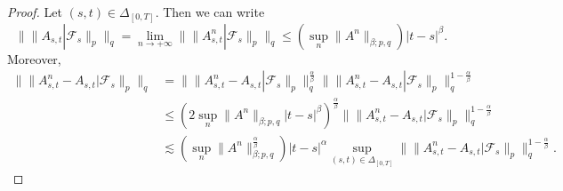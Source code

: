 \documentclass[11pt,a4paper]{article}
\theoremstyle{plain}
\begin{document}
\begin{proof}
  Let $(s, t) \in \Delta_{[0, T]}$. Then we can write \begin{equation*}
      \|\|A_{s, t} | \mathcal{F}_s \|_p \|_q = \lim_{n \to + \infty} \|\|A^n_{s, t} | \mathcal{F}_s \|_p \|_q \le (\sup_n \|A^n \|_{\beta ; p, q}) | t - s |^{\beta}.
  \end{equation*} Moreover,
  \begin{align*}
    \|\|A^n_{s, t} - A_{s, t} | \mathcal{F}_s \|_p \|_q & = 
    \|\|A^n_{s, t} - A_{s, t} | \mathcal{F}_s  \|_p
    \|_q^{\frac{\alpha}{\beta}} \|\|A^n_{s, t} - A_{s, t} | \mathcal{F}_s  \|_p \|_q^{1 - \frac{\alpha}{\beta}}\\
    & \le (2 \sup_n \|A^n \|_{\beta ; p, q}  | t - s
    |^{\beta})^{\frac{\alpha}{\beta}}  \|\|A^n_{s, t} - A_{s, t} | \mathcal{F}_s \|_p \|_q^{1 - \frac{\alpha}{\beta}}\\
    & \lesssim  \left( \sup_n \|A^n \|_{\beta ; p, q}^{\frac{\alpha}{\beta}}\right) | t - s |^{\alpha}  \sup_{(s, t) \in \Delta_{[0, T]}} \|\|A^n_{s, t} - A_{s, t} | \mathcal{F}_s  \|_p \|_q^{1 - \frac{\alpha}{\beta}} .
  \end{align*}
\end{proof}
\end{document}

